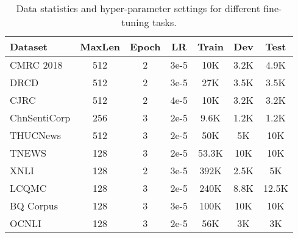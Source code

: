 \documentclass[journal]{IEEEtran}
\begin{document}
\begin{CJK*}{UTF8}{gbsn}
\begin{table}[tbp]
\caption{\label{hyper} Data statistics and hyper-parameter settings for different fine-tuning tasks.}
\begin{center}
\begin{tabular}{l c c c | c c c}
\toprule
\bf Dataset  & \bf MaxLen & \bf Epoch & \bf LR & \bf Train & \bf Dev & \bf Test \\
\midrule
CMRC 2018   		& 512 & 2 & 3e-5 & 10K & 3.2K & 4.9K  \\
DRCD 			& 512 & 2 & 3e-5 & 27K & 3.5K & 3.5K  \\
CJRC 			& 512 & 2 & 4e-5 & 10K & 3.2K & 3.2K  \\
\midrule
ChnSentiCorp 	& 256 & 3 & 2e-5 & 9.6K & 1.2K & 1.2K \\
THUCNews 		& 512 & 3 & 2e-5 & 50K & 5K & 10K  \\
TNEWS		& 128 & 3 & 2e-5 & 53.3K & 10K & 10K \\
\midrule
XNLI			& 128 & 2 & 3e-5 & 392K & 2.5K & 5K  \\
LCQMC 			& 128 & 3 & 2e-5 & 240K & 8.8K & 12.5K  \\
BQ Corpus	  	& 128 & 3 & 3e-5 & 100K & 10K & 10K  \\
OCNLI 		& 128 & 3 & 2e-5 & 56K & 3K & 3K \\
\bottomrule
\end{tabular}
\end{center}
\end{table}



\end{CJK*}
\end{document}
